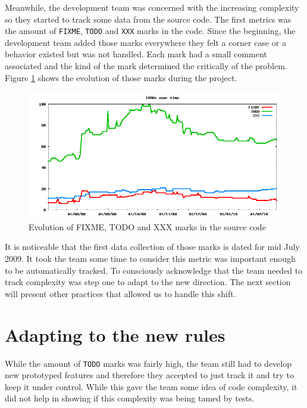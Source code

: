 \documentclass[lnbip]{svmultln}
\begin{document}
Meanwhile, the development team was concerned with the increasing
complexity so they started to track some data from the source
code. The first metrics was the amount of \texttt{FIXME},
\texttt{TODO} and \texttt{XXX} marks in the code. Since the beginning,
the development team added those marks everywhere they felt a corner
case or a behavior existed but was not handled. Each mark had a small
comment associated and the kind of the mark determined the critically
of the problem. Figure \ref{fig:TODOs} shows the evolution of those
marks during the project.

\begin{figure}[hbt]
  \centerline{
    \includegraphics[width=120mm]{TODOs.png}
  }
  \caption{Evolution of FIXME, TODO and XXX marks in the source code}
  \label{fig:TODOs}
\end{figure}

It is noticeable that the first data collection of those marks is
dated for mid July 2009. It took the team some time to consider this
metric was important enough to be automatically tracked. To
consciously acknowledge that the team needed to track complexity was
step one to adapt to the new direction. The next section will present
other practices that allowed us to handle this shift.

\section{Adapting to the new rules}
\label{sec:adapting}

While the amount of \texttt{TODO} marks was fairly high, the team
still had to develop new prototyped features and therefore they
accepted to just track it and try to keep it under control. While this
gave the team some idea of code complexity, it did not help in showing
if this complexity was being tamed by tests.
\end{document}
